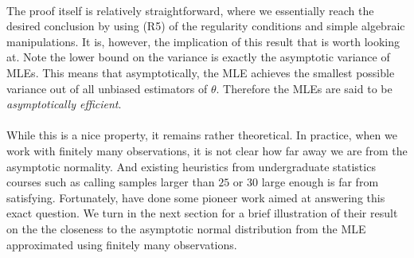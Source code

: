 $ $\\
The proof itself is relatively straightforward, where we essentially reach the desired conclusion by using (R5) of the regularity conditions and simple algebraic manipulations. It is, however, the implication of this result that is worth looking at. Note the lower bound on the variance is exactly the asymptotic variance of MLEs. This means that asymptotically, the MLE achieves the smallest possible variance out of all unbiased estimators of $\theta$. Therefore the MLEs are said to be \emph{asymptotically efficient}.\\\\
While this is a nice property, it remains rather theoretical. In practice, when we work with finitely many observations, it is not clear how far away we are from the asymptotic normality. And existing heuristics from undergraduate statistics courses such as calling samples larger than $25$ or $30$ large enough is far from satisfying. Fortunately, \cite{anastasiou2015bounds} have done some pioneer work aimed at answering this exact question. We turn in the next section for a brief illustration of their result on the the closeness to the asymptotic normal distribution from the MLE approximated using finitely many observations.
